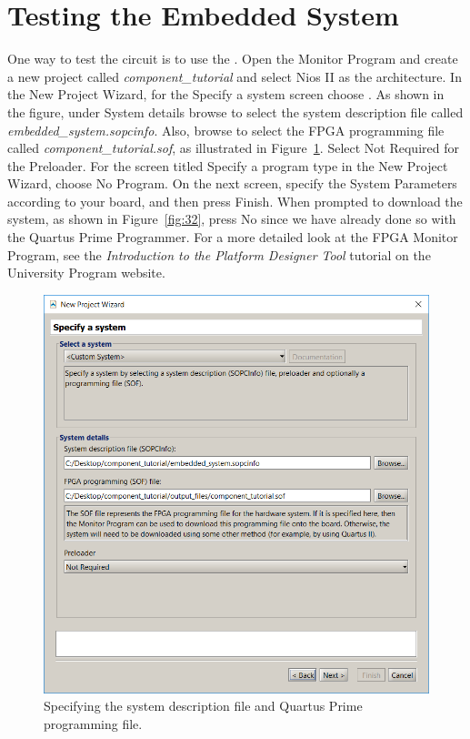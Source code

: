 \documentclass[11pt, twoside, pdftex]{article}
\begin{document}
\clearpage
\newpage
\section{Testing the Embedded System}
One way to test the circuit is to use the \productNameMed{}. Open the Monitor Program
and create a new project called {\it component\_tutorial} and select {\sf Nios II} as the architecture. In the {\sf New Project Wizard}, for
the {\sf Specify a system} screen choose {}. As shown in the figure, under {\sf System details} browse to select the 
{\sf system description file} called {\it embedded\_system.sopcinfo}. Also, browse to select
the {\sf FPGA programming file} called {\it component\_tutorial.sof}, as illustrated in
Figure~\ref{fig:31}.  Select {\sf Not Required} for the {\sf Preloader}. For the screen titled {\sf Specify a program type} in the {\sf New Project
Wizard}, choose {\sf No Program}. On the next screen, specify the System Parameters according to your board, and then press {\sf Finish}. When prompted to download the system, as shown in Figure~\ref{fig:32}, press {\sf No} since we have already done so with the Quartus Prime Programmer. For a more detailed look at the FPGA Monitor Program, see the {\it Introduction to the Platform Designer Tool} tutorial on the University Program website.

\begin{figure}[H]
   \begin{center}
        \includegraphics[scale=0.6]{figures/figure31.png}
   \end{center}
   \caption{Specifying the system description file and Quartus Prime programming file.}
	\label{fig:31}
\end{figure}
\end{document}
